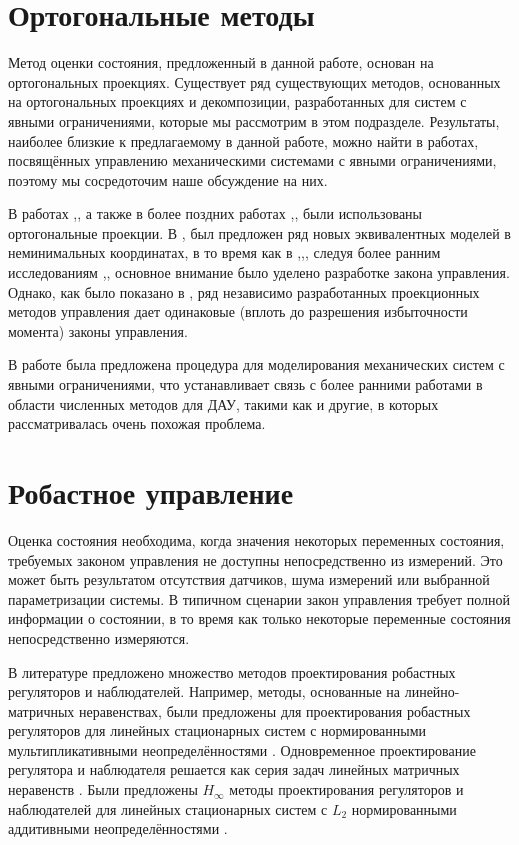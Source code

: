 \section{Ортогональные методы}\label{sec:ch1/sec3}
Метод оценки состояния, предложенный в данной работе, основан на ортогональных проекциях. Существует ряд существующих методов, основанных на ортогональных проекциях и декомпозиции, разработанных для систем с явными ограничениями, которые мы рассмотрим в этом подразделе. Результаты, наиболее близкие к предлагаемому в данной работе, можно найти в работах, посвящённых управлению механическими системами с явными ограничениями, поэтому мы сосредоточим наше обсуждение на них.

В работах \cite{Aghili2003},\cite{Aghili2005}, а также в более поздних работах \cite{Mistry2010},\cite{Righetti2011},\cite{Righetti2013} были использованы ортогональные проекции. В \cite{Aghili2003},\cite{Aghili2005} был предложен ряд новых эквивалентных моделей в неминимальных координатах, в то время как в \cite{Mistry2010},\cite{Righetti2011},\cite{Righetti2013}, следуя более ранним исследованиям \cite{Khatib2007},\cite{Sentis2005}, основное внимание было уделено разработке закона управления. Однако, как было показано в \cite{Righetti2011}, ряд независимо разработанных проекционных методов управления дает одинаковые (вплоть до разрешения избыточности момента) законы управления.

В работе \cite{Aghili2003} была предложена процедура для моделирования механических систем с явными ограничениями, что устанавливает связь с более ранними работами в области численных методов для ДАУ, такими как \cite{Liang1987} и другие, в которых рассматривалась очень похожая проблема.

\section{Робастное управление}\label{sec:ch1/sec4}
Оценка состояния необходима, когда значения некоторых переменных состояния, требуемых законом управления не доступны непосредственно из измерений. Это может быть результатом отсутствия датчиков, шума измерений или выбранной параметризации системы. В типичном сценарии закон управления требует полной информации о состоянии, в то время как только некоторые переменные состояния непосредственно измеряются.

В литературе предложено множество методов проектирования робастных регуляторов и наблюдателей. Например, методы, основанные на линейно-матричных неравенствах, были предложены для проектирования робастных регуляторов для линейных стационарных систем с нормированными мультипликативными неопределённостями \cite{POLYAK2021,ROTONDO2014}.
Одновременное проектирование регулятора и наблюдателя решается как серия задач линейных матричных неравенств \cite{ZEMOUCHE2015,GRITLI2021}. Были предложены $H_\infty$ методы проектирования регуляторов и наблюдателей для линейных стационарных систем с $L_2$ нормированными аддитивными неопределённостями \cite{Bennani2019, KHELOUFI2016}.

